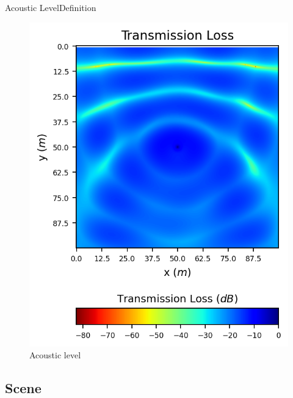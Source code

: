 \documentclass[9pt, xcolor={usenames, dvipsnames}]{beamer}
\begin{document}
\begin{frame}{Acoustic Level}{Definition}
\begin{minipage}[c]{0.35\textwidth}
\begin{figure}
							\includegraphics[width=\textwidth]{images/sphere/ampltude.png}
							\caption{Acoustic level}
						\end{figure}
					\end{minipage}
				\end{frame}

			\subsection{Scene}
\end{document}
